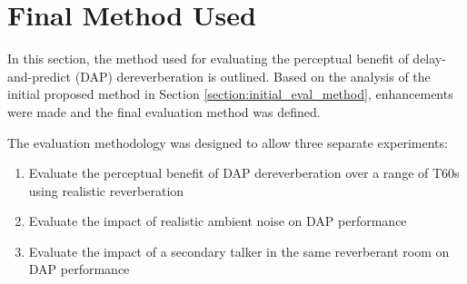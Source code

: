 





\section{Final Method Used} \label{section:final_method}

In this section, the method used for evaluating the perceptual benefit of delay-and-predict (DAP) dereverberation is outlined. Based on the analysis of the initial proposed method in Section \ref{section:initial_eval_method}, enhancements were made and the final evaluation method was defined.

The evaluation methodology was designed to allow three separate experiments:

\begin{enumerate}
	\item Evaluate the perceptual benefit of DAP dereverberation over a range of T60s using realistic reverberation
	\item Evaluate the impact of realistic ambient noise on DAP performance
	\item Evaluate the impact of a secondary talker in the same reverberant room on DAP performance
\end{enumerate}

